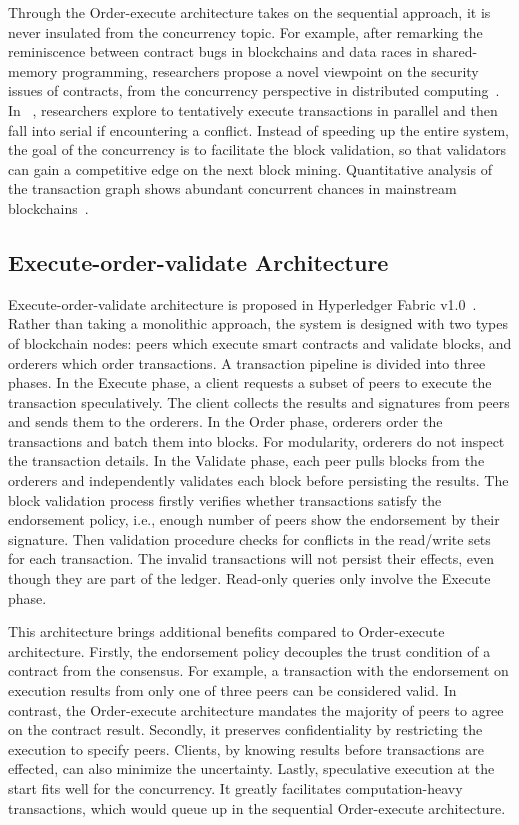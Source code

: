Through the Order-execute architecture takes on the sequential approach, it is never insulated from the concurrency topic. 
For example, after remarking the reminiscence between contract bugs in blockchains and data races in shared-memory programming, researchers propose a novel viewpoint on the security issues of contracts, from the concurrency perspective in distributed computing~\cite{herlihy2019blockchains,sergey2017concurrent}. 
In ~\cite{dickerson2019adding}, researchers explore to tentatively execute transactions in parallel and then fall into serial if encountering a conflict.  
Instead of speeding up the entire system, the goal of the concurrency is to facilitate the block validation, so that validators can gain a competitive edge on the next block mining. 
Quantitative analysis of the transaction graph shows abundant concurrent chances in mainstream blockchains~\cite{reijsbergen2020exploiting,saraph2019empirical}. 

\subsection{Execute-order-validate Architecture}
\label{ch:literature:execution:execute-order-validate}
Execute-order-validate architecture is proposed in Hyperledger Fabric v1.0~\cite{androulaki2018hyperledger}. 
Rather than taking a monolithic approach, the system is designed with two types of blockchain nodes: peers which execute smart contracts and validate blocks, and orderers which order transactions. 
A transaction pipeline is divided into three phases. 
In the Execute phase, a client requests a subset of peers to execute the transaction speculatively. 
The client collects the results and signatures from peers and sends them to the orderers. 
In the Order phase, orderers order the transactions and batch them into blocks.
For modularity, orderers do not inspect the transaction details. 
In the Validate phase, each peer pulls blocks from the orderers and independently validates each block before persisting the results. 
The block validation process firstly verifies whether transactions satisfy the endorsement policy, i.e., enough number of peers show the endorsement by their signature. 
Then validation procedure checks for conflicts in the read/write sets for each transaction. 
The invalid transactions will not persist their effects, even though they are part of the ledger. 
Read-only queries only involve the Execute phase. 

This architecture brings additional benefits compared to Order-execute architecture. 
Firstly, the endorsement policy decouples the trust condition of a contract from the consensus. 
For example, a transaction with the endorsement on execution results from only one of three peers can be considered valid. 
In contrast, the Order-execute architecture mandates the majority of peers to agree on the contract result. 
Secondly, it preserves confidentiality by restricting the execution to specify peers.
Clients, by knowing results before transactions are effected, can also minimize the uncertainty. 
Lastly, speculative execution at the start fits well for the concurrency.
It greatly facilitates computation-heavy transactions, which would queue up in the sequential Order-execute architecture. 


